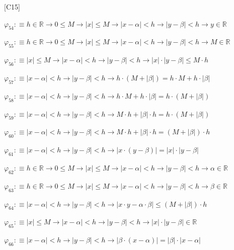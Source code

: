 \begin{fullproof}{[C15]}
\begin{abbrevlist}
\item $\varphi_{54} :\equiv h \in \mathbb{R} \to 0 \leq M \to \lvert x \rvert \leq M \to \lvert x - \alpha \rvert < h \to \lvert y - \beta \rvert < h \to y \in \mathbb{R}$
\item $\varphi_{55} :\equiv h \in \mathbb{R} \to 0 \leq M \to \lvert x \rvert \leq M \to \lvert x - \alpha \rvert < h \to \lvert y - \beta \rvert < h \to M \in \mathbb{R}$
\item $\varphi_{56} :\equiv \lvert x \rvert \leq M \to \lvert x - \alpha \rvert < h \to \lvert y - \beta \rvert < h \to \lvert x \rvert \cdot \lvert y - \beta \rvert \leq M \cdot h$
\item $\varphi_{57} :\equiv \lvert x - \alpha \rvert < h \to \lvert y - \beta \rvert < h \to h \cdot (M + \lvert \beta \rvert) = h \cdot M + h \cdot \lvert \beta \rvert$
\item $\varphi_{58} :\equiv \lvert x - \alpha \rvert < h \to \lvert y - \beta \rvert < h \to h \cdot M + h \cdot \lvert \beta \rvert = h \cdot (M + \lvert \beta \rvert)$
\item $\varphi_{59} :\equiv \lvert x - \alpha \rvert < h \to \lvert y - \beta \rvert < h \to M \cdot h + \lvert \beta \rvert \cdot h = h \cdot (M + \lvert \beta \rvert)$
\item $\varphi_{60} :\equiv \lvert x - \alpha \rvert < h \to \lvert y - \beta \rvert < h \to M \cdot h + \lvert \beta \rvert \cdot h = (M + \lvert \beta \rvert) \cdot h$
\item $\varphi_{61} :\equiv \lvert x - \alpha \rvert < h \to \lvert y - \beta \rvert < h \to \lvert x \cdot (y - \beta) \rvert = \lvert x \rvert \cdot \lvert y - \beta \rvert$
\item $\varphi_{62} :\equiv h \in \mathbb{R} \to 0 \leq M \to \lvert x \rvert \leq M \to \lvert x - \alpha \rvert < h \to \lvert y - \beta \rvert < h \to \alpha \in \mathbb{R}$
\item $\varphi_{63} :\equiv h \in \mathbb{R} \to 0 \leq M \to \lvert x \rvert \leq M \to \lvert x - \alpha \rvert < h \to \lvert y - \beta \rvert < h \to \beta \in \mathbb{R}$
\item $\varphi_{64} :\equiv \lvert x - \alpha \rvert < h \to \lvert y - \beta \rvert < h \to \lvert x \cdot y - \alpha \cdot \beta \rvert \leq (M + \lvert \beta \rvert) \cdot h$
\item $\varphi_{65} :\equiv \lvert x \rvert \leq M \to \lvert x - \alpha \rvert < h \to \lvert y - \beta \rvert < h \to \lvert x \rvert \cdot \lvert y - \beta \rvert \in \mathbb{R}$
\item $\varphi_{66} :\equiv \lvert x - \alpha \rvert < h \to \lvert y - \beta \rvert < h \to \lvert \beta \cdot (x - \alpha) \rvert = \lvert \beta \rvert \cdot \lvert x - \alpha \rvert$

\end{abbrevlist}
\end{fullproof}
